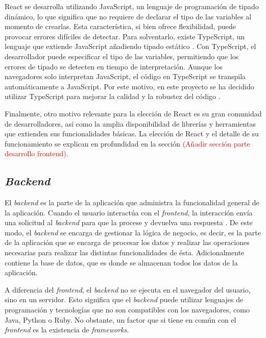 React se desarrolla utilizando JavaScript, un lenguaje de programación de tipado dinámico, lo que significa que no requiere de declarar el tipo de las variables al momento de crearlas. Esta característica, si bien ofrece flexibilidad, puede provocar errores difíciles de detectar. Para solventarlo, existe TypeScript, un lenguaje que extiende JavaScript añadiendo tipado estático \cite{typescript}. Con TypeScript, el desarrollador puede especificar el tipo de las variables, permitiendo que los errores de tipado se detecten en tiempo de interpretación. Aunque los navegadores solo interpretan JavaScript, el código en TypeScript se transpila automáticamente a JavaScript. Por este motivo, en este proyecto se ha decidido utilizar TypeScript para mejorar la calidad y la robustez del código \cite{tipado}.

Finalmente, otro motivo relevante para la elección de React es su gran comunidad de desarrolladores, así como la amplia disponibilidad de librerías y herramientas que extienden sus funcionalidades básicas. La elección de React y el detalle de su funcionamiento se explican en profundidad en la sección \textcolor{red}{(Añadir sección parte desarrollo frontend)}.

\subsection{\textit{Backend}}

El \textit{backend} es la parte de la aplicación que administra la funcionalidad general de la aplicación. Cuando el usuario interactúa con el \textit{frontend}, la interacción envía una solicitud al \textit{backend} para que la procese y devuelva una respuesta \cite{aws_frontend_backend}. De este modo, el \textit{backend} se encarga de gestionar la lógica de negocio, es decir, es la parte de la aplicación que se encarga de procesar los datos y realizar las operaciones necesarias para realizar las distintas funcionalidades de ésta. Adicionalmente contiene la base de datos, que es donde se almacenan todos los datos de la aplicación.

A diferencia del \textit{frontend}, el \textit{backend} no se ejecuta en el navegador del usuario, sino en un servidor. Esto significa que el \textit{backend} puede utilizar lenguajes de programación y tecnologías que no son compatibles con los navegadores, como Java, Python o Ruby. No obstante, un factor que si tiene en común con el \textit{frontend} es la existencia de \textit{frameworks}.

